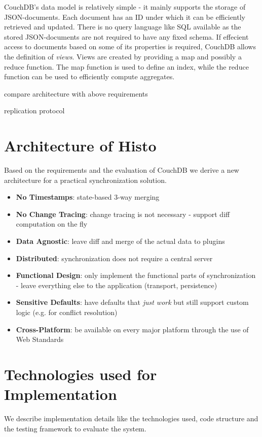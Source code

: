 CouchDB's data model is relatively simple - it mainly supports the storage of JSON-documents.
Each document has an ID under which it can be efficiently retrieved and updated.
There is no query language like SQL available as the stored JSON-documents are not required to have any fixed schema.
If effecient access to documents based on some of its properties is required, CouchDB allows the definition of \emph{views}.
Views are created by providing a map and possibly a reduce function.
The map function is used to define an index, while the reduce function can be used to efficiently compute aggregates.

compare architecture with above requirements

replication protocol

\section{Architecture of Histo}
Based on the requirements and the evaluation of CouchDB we derive a new architecture for a practical synchronization solution.

\begin{itemize}
\item
  \textbf{No Timestamps}: state-based 3-way merging
\item
  \textbf{No Change Tracing}: change tracing is not necessary - support
  diff computation on the fly
\item
  \textbf{Data Agnostic}: leave diff and merge of the actual data to
  plugins
\item
  \textbf{Distributed}: synchronization does not require a central server
\item
  \textbf{Functional Design}: only implement the functional parts of synchronization -
  leave everything else to the application (transport, persistence)
\item
  \textbf{Sensitive Defaults}: have defaults that \emph{just work} but
  still support custom logic (e.g. for conflict resolution)
\item
  \textbf{Cross-Platform}: be available on every major platform through the use of Web Standards
\end{itemize}

\section{Technologies used for Implementation}
We describe implementation details like the technologies used, code structure and the testing framework to evaluate the system.

